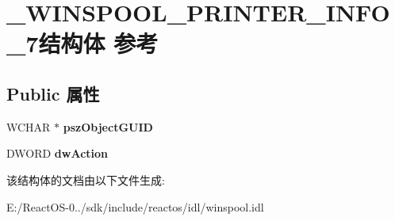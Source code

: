 \hypertarget{struct___w_i_n_s_p_o_o_l___p_r_i_n_t_e_r___i_n_f_o__7}{}\section{\+\_\+\+W\+I\+N\+S\+P\+O\+O\+L\+\_\+\+P\+R\+I\+N\+T\+E\+R\+\_\+\+I\+N\+F\+O\+\_\+7结构体 参考}
\label{struct___w_i_n_s_p_o_o_l___p_r_i_n_t_e_r___i_n_f_o__7}
\subsection*{Public 属性}
\begin{DoxyCompactItemize}
\item 
\mbox{\label{struct___w_i_n_s_p_o_o_l___p_r_i_n_t_e_r___i_n_f_o__7_a0c1a011cd884bfb09b2be3a321711f89}} 
W\+C\+H\+AR $\ast$ {\bfseries psz\+Object\+G\+U\+ID}
\item 
\mbox{\label{struct___w_i_n_s_p_o_o_l___p_r_i_n_t_e_r___i_n_f_o__7_a3142c20bcfe6d72db440e79603a5814b}} 
D\+W\+O\+RD {\bfseries dw\+Action}
\end{DoxyCompactItemize}


该结构体的文档由以下文件生成\+:\begin{DoxyCompactItemize}
\item 
E\+:/\+React\+O\+S-\/0../sdk/include/reactos/idl/winspool.\+idl\end{DoxyCompactItemize}
